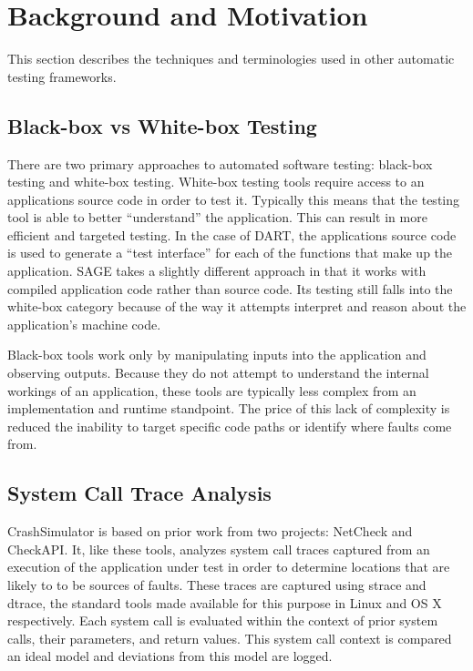 \section{Background and Motivation}

    This section describes the techniques and terminologies used in other automatic testing frameworks.

    \subsection{Black-box vs White-box Testing}

        There are two primary approaches to automated software testing: black-box testing and white-box testing.
        White-box testing tools require access to an applications source code in order to test it. Typically this means
        that the testing tool is able to better ``understand'' the application. This can result in more efficient and
        targeted testing. In the case of DART, the applications source code is used to generate a ``test interface'' for
        each of the functions that make up the application. SAGE takes a slightly different approach in that it works
        with compiled application code rather than source code. Its testing still falls into the white-box category
        because of the way it attempts interpret and reason about the application's machine code.

        Black-box tools work only by manipulating inputs into the application and observing outputs. Because they do not
        attempt to understand the internal workings of an application, these tools are typically less complex from an
        implementation and runtime standpoint. The price of this lack of complexity is reduced the inability to target
        specific code paths or identify where faults come from.

    \subsection{System Call Trace Analysis}

        CrashSimulator is based on prior work from two projects: NetCheck and CheckAPI. It, like these tools, analyzes
        system call traces captured from an execution of the application under test in order to determine locations that
        are likely to to be sources of faults. These traces are captured using strace and dtrace, the standard tools
        made available for this purpose in Linux and OS X respectively. Each system call is evaluated within the context
        of prior system calls, their parameters, and return values. This system call context is compared an ideal model
        and deviations from this model are logged.

